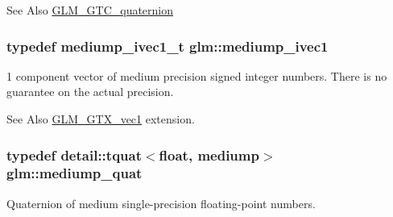 \begin{DoxySeeAlso}{See Also}
\hyperlink{group__gtc__quaternion}{G\-L\-M\-\_\-\-G\-T\-C\-\_\-quaternion} 
\end{DoxySeeAlso}
\hypertarget{namespaceglm_a7efcceaaa791c2380d1b17bd7baa45ee}{
\subsubsection[{mediump\-\_\-ivec1}]{\setlength{\rightskip}{0pt plus 5cm}typedef {\bf mediump\-\_\-ivec1\-\_\-t} {\bf glm\-::mediump\-\_\-ivec1}}}\label{namespaceglm_a7efcceaaa791c2380d1b17bd7baa45ee}
1 component vector of medium precision signed integer numbers. There is no guarantee on the actual precision. \begin{DoxySeeAlso}{See Also}
\hyperlink{group__gtx__vec1}{G\-L\-M\-\_\-\-G\-T\-X\-\_\-vec1} extension. 
\end{DoxySeeAlso}
\hypertarget{namespaceglm_aa891775f83d9da605b5dd0dc34a3ef62}{
\subsubsection[{mediump\-\_\-quat}]{\setlength{\rightskip}{0pt plus 5cm}typedef {\bf detail\-::tquat}$<$float, mediump$>$ {\bf glm\-::mediump\-\_\-quat}}}\label{namespaceglm_aa891775f83d9da605b5dd0dc34a3ef62}
Quaternion of medium single-\/precision floating-\/point numbers.

